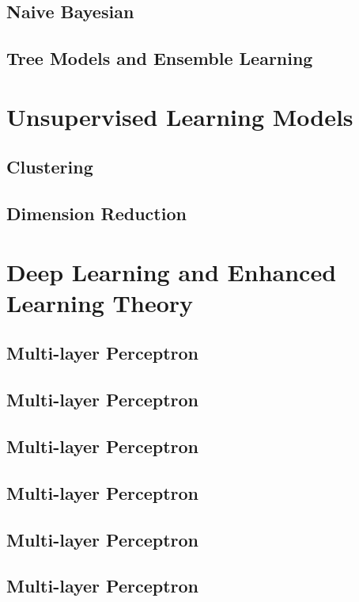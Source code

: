 \documentclass[11pt, openany]{book}              %
\begin{document}
\chapter{Naive Bayesian}

\chapter{Tree Models and Ensemble Learning}

\part{Unsupervised Learning Models}

\chapter{Clustering}

\chapter{Dimension Reduction}



\part{Deep Learning and Enhanced Learning Theory}

\chapter{Multi-layer Perceptron}

\chapter{Multi-layer Perceptron}

\chapter{Multi-layer Perceptron}

\chapter{Multi-layer Perceptron}

\chapter{Multi-layer Perceptron}

\chapter{Multi-layer Perceptron}

 
\end{document}
